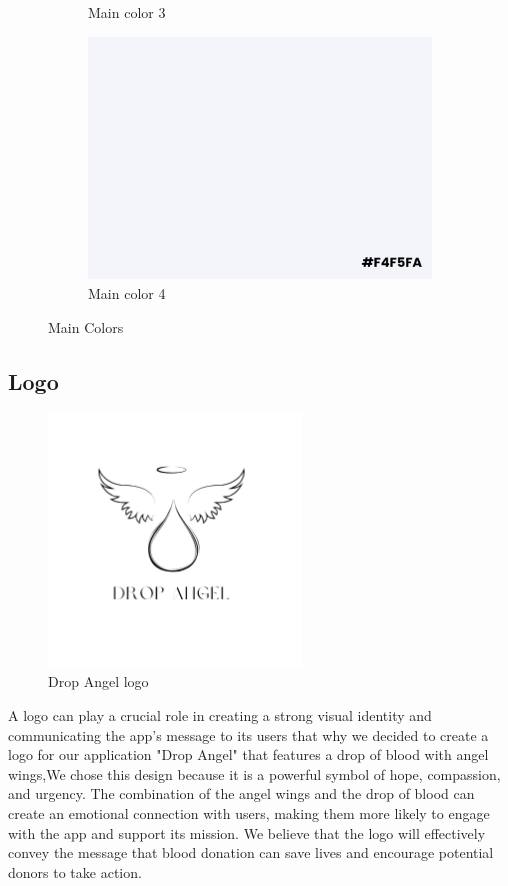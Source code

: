 \begin{figure}[H]
\begin{subfigure}{.5\textwidth}
  \caption{Main color 3}
  \label{fig:sub-third}
\end{subfigure}
\begin{subfigure}{.5\textwidth}
  \centering
  \includegraphics[width=.9\linewidth]{images/5.png} 
  \caption{Main color 4}
  \label{fig:sub-fourth}
\end{subfigure}
\caption{Main Colors}
\label{fig:fig}
\end{figure}


\subsection{Logo }

\begin{figure}[H]
    \centering
    \includegraphics[width=0.6\textwidth]{images/logo.png}
    \caption{Drop Angel logo}
    \label{fig:figure4}
\end{figure}
A logo can play a crucial role in creating a strong visual identity and communicating the app's message to its users that why we decided to create a logo for our application "Drop Angel" that features a drop of blood with angel wings,We chose this design because it is a powerful symbol of hope, compassion, and urgency. The combination of the angel wings and the drop of blood can create an emotional connection with users, making them more likely to engage with the app and support its mission. We believe that the logo will effectively convey the message that blood donation can save lives and encourage potential donors to take action.


